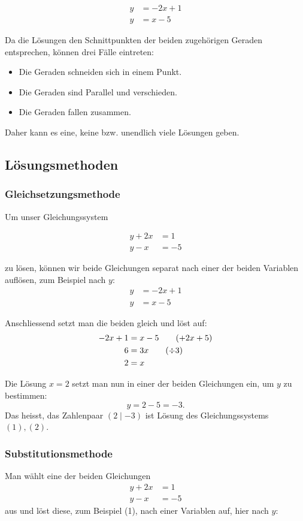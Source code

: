 \documentclass[%
11pt,%
twoside,%
titlepage,%
swissgerman,%
headsepline%
]{scrartcl}
\theoremstyle{definition}
\theoremstyle{plain}
\begin{document}
	\begin{align}
		y&=-2x+1\tag{$1'$}\\
		y&=x-5\tag{$2'$}
	\end{align}
	
	Da die Lösungen den Schnittpunkten der beiden zugehörigen Geraden entsprechen, können drei Fälle eintreten:
	
	\begin{itemize}
		\item Die Geraden schneiden sich in einem Punkt.
		\item Die Geraden sind Parallel und verschieden.
		\item Die Geraden fallen zusammen.
	\end{itemize}
	
	Daher kann es eine, keine bzw. unendlich viele Lösungen geben.
	
	\subsection{Lösungsmethoden}
	\subsubsection{Gleichsetzungsmethode}
	
	Um unser Gleichungssystem
	
	\begin{align}
		y+2x&=1\tag{1}\\
		y-x&=-5\tag{2}
	\end{align}
	
	zu lösen, können wir beide Gleichungen separat nach einer der beiden Variablen auflösen, zum Beispiel nach $y$:
	\begin{align}
		y&=-2x+1\tag{$1'$}\\
		y&=x-5\tag{$2'$}
	\end{align}
	
	Anschliessend setzt man die beiden gleich und löst auf:
	\begin{align}
		-2x+1&=x-5\tag{$+2x+5$}\\
		6&=3x\tag{$\div3$}\\
		2&=x\notag
	\end{align}
	
	Die Lösung $x=2$ setzt man nun in einer der beiden Gleichungen ein, um $y$ zu bestimmen:
	$$y=2-5=-3.$$
	Das heisst, das Zahlenpaar $(2\mid -3)$ ist Lösung des Gleichungssystems $(1), (2)$.
	
	\subsubsection{Substitutionsmethode}
	Man wählt eine der beiden Gleichungen
	\begin{align}
		y+2x&=1\tag{1}\\
		y-x&=-5\tag{2}
	\end{align}
	aus und löst diese, zum Beispiel (1), nach einer Variablen auf, hier nach $y$:
	
\end{document}
